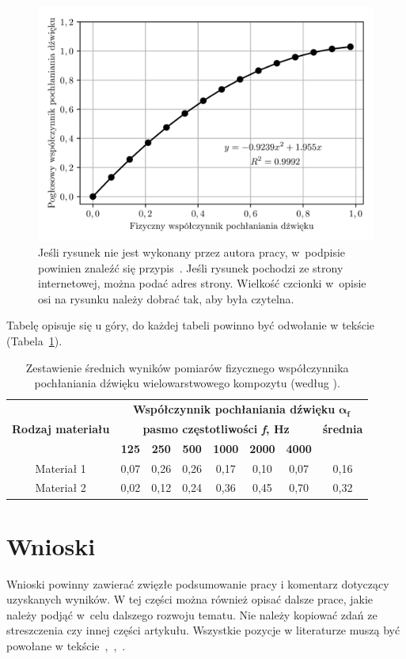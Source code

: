 \documentclass[12pt]{oska}
\begin{document}
\begin{figure}[H]
	\centering
	\includegraphics[width=\textwidth]{sample_rys1.png}
	\caption{Jeśli rysunek nie jest wykonany przez autora pracy, w~podpisie powinien znaleźć się przypis~\cite{bib2}. Jeśli rysunek pochodzi ze strony internetowej, można podać adres strony. Wielkość czcionki w~opisie osi na rysunku należy dobrać tak, aby była czytelna.}
	\label{rys1}
\end{figure}

Tabelę opisuje się u góry, do każdej tabeli powinno być odwołanie w tekście (Tabela~\ref{tab1}).

\begin{table}[H]
	\centering
	\caption{Zestawienie średnich wyników pomiarów fizycznego współczynnika pochłaniania dźwięku wielowarstwowego kompozytu (według \cite{bib2}).}
	\label{tab1}
	\begin{tabular}{|c|c|c|c|c|c|c|c|}
		\hline
		\multirow{3}{*}{\textbf{Rodzaj materiału}} & \multicolumn{7}{|c|}{\textbf{Współczynnik pochłaniania dźwięku} $\boldsymbol{\alpha_f}$} \\\cline{2-8}
		& \multicolumn{6}{|c|}{\textbf{pasmo częstotliwości \textit{f}, Hz}} & \textbf{średnia}\\\cline{2-8}
		& \textbf{125} & \textbf{250} & \textbf{500} & \textbf{1000} & \textbf{2000} & \textbf{4000} &\\\hline
		Materiał 1 & 0,07 & 0,26 & 0,26 & 0,17 & 0,10 & 0,07 & 0,16 \\\hline
		Materiał 2 & 0,02 & 0,12 & 0,24 & 0,36 & 0,45 & 0,70 & 0,32 \\\hline
	\end{tabular}
\end{table}

\section{Wnioski}

Wnioski powinny zawierać zwięzłe podsumowanie pracy i komentarz dotyczący uzyskanych wyników. W tej części można również opisać dalsze prace, jakie należy podjąć w celu dalszego rozwoju tematu. Nie należy kopiować zdań ze streszczenia czy innej części artykułu. Wszystkie pozycje w literaturze muszą być powołane w tekście~\cite{bib3},~\cite{bib4},~\cite{bib5}. 

\printbibliography
\end{document}
